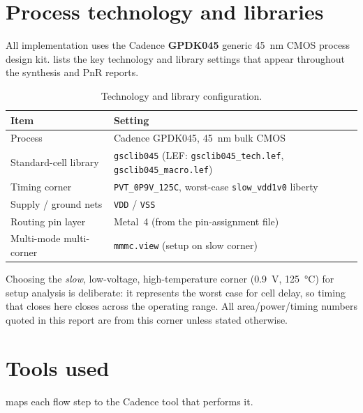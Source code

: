 \section{Process technology and libraries}
All implementation uses the Cadence \textbf{GPDK045} generic
\SI{45}{\nano\meter} CMOS process design kit.  lists the
key technology and library settings that appear throughout the synthesis
and PnR reports.

\begin{table}[htbp]
\centering
\caption{Technology and library configuration.}
\label{tab:tech}
\small
\begin{tabularx}{\linewidth}{@{}l X@{}}
\toprule
Item & Setting \\
\midrule
Process               & Cadence GPDK045, \SI{45}{\nano\meter} bulk CMOS \\
Standard-cell library & \texttt{gsclib045} (LEF: \texttt{gsclib045\_tech.lef},
                        \texttt{gsclib045\_macro.lef}) \\
Timing corner         & \texttt{PVT\_0P9V\_125C}, worst-case
                        \texttt{slow\_vdd1v0} liberty \\
Supply / ground nets  & \texttt{VDD} / \texttt{VSS} \\
Routing pin layer     & Metal~4 (from the pin-assignment file) \\
Multi-mode multi-corner& \texttt{mmmc.view} (setup on slow corner) \\
\bottomrule
\end{tabularx}
\end{table}

Choosing the \emph{slow}, low-voltage, high-temperature corner
(\SI{0.9}{\volt}, \SI{125}{\celsius}) for setup analysis is deliberate: it
represents the worst case for cell delay, so timing that closes here
closes across the operating range. All area/power/timing numbers quoted in
this report are from this corner unless stated otherwise.

\section{Tools used}
 maps each flow step to the Cadence tool that performs it.

